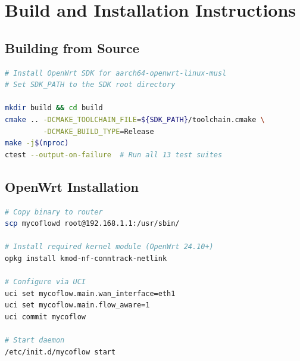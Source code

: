 \section{Build and Installation Instructions}

\subsection{Building from Source}

\begin{lstlisting}[language=bash, basicstyle=\ttfamily\small]
# Install OpenWrt SDK for aarch64-openwrt-linux-musl
# Set SDK_PATH to the SDK root directory

mkdir build && cd build
cmake .. -DCMAKE_TOOLCHAIN_FILE=${SDK_PATH}/toolchain.cmake \
         -DCMAKE_BUILD_TYPE=Release
make -j$(nproc)
ctest --output-on-failure  # Run all 13 test suites
\end{lstlisting}

\subsection{OpenWrt Installation}

\begin{lstlisting}[language=bash, basicstyle=\ttfamily\small]
# Copy binary to router
scp mycoflowd root@192.168.1.1:/usr/sbin/

# Install required kernel module (OpenWrt 24.10+)
opkg install kmod-nf-conntrack-netlink

# Configure via UCI
uci set mycoflow.main.wan_interface=eth1
uci set mycoflow.main.flow_aware=1
uci commit mycoflow

# Start daemon
/etc/init.d/mycoflow start
\end{lstlisting}
